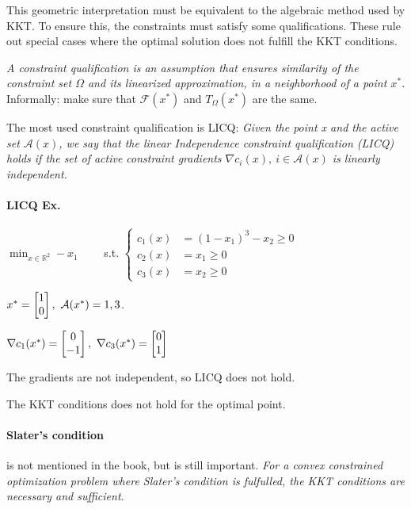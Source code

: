 \documentclass{article}
\begin{document}
This geometric interpretation must be equivalent to the algebraic method used by KKT. To ensure this, the constraints must satisfy some qualifications.
These rule out special cases where the optimal solution does not fulfill the KKT conditions.


\medskip \textit{A constraint qualification is an assumption that ensures similarity of the constraint set $\Omega$ and
  its linearized approximation, in a neighborhood of a point $x^*$.} Informally: make sure that $\mathcal{F}(x^*)$ and $T_{\Omega}(x^*)$ are the same.

\medskip The most used constraint qualification is LICQ: \textit{Given the point x and the active set $\mathcal{A}(x)$, we say that the linear Independence constraint qualification (LICQ) holds if the set
  of active constraint gradients $\nabla c_i(x),\ i\in \mathcal{A}(x)$ is linearly independent.}

\paragraph{LICQ Ex.} $\min_{x \in\mathbb{R}^{2}} -x_1 \qquad$ s.t.
$
  \left\{
  \begin{aligned}
    c_1(x) & = (1-x_1)^3 - x_2 \geq 0 \\
    c_2(x) & = x_1 \geq 0             \\
    c_3(x) & = x_2 \geq 0
  \end{aligned}
  \right.
$

\begin{minipage}[c]{0.5\textwidth}
\end{minipage}
\begin{minipage}[c]{0.5\textwidth}
  $x^* =\begin{bmatrix} 1 \\ 0 \end{bmatrix},\ \mathcal{A}(x^*) = {1, 3}$.
  
  \medskip $\nabla c_1(x^*) = \begin{bmatrix} 0 \\ -1 \end{bmatrix} ,\ \nabla c_3(x^*) = \begin{bmatrix} 0 \\ 1 \end{bmatrix}$

  \medskip The gradients are not independent, so LICQ does not hold.
\end{minipage}

The KKT conditions does not hold for the optimal point. 

\paragraph{Slater's condition} is not mentioned in the book, but is still important. \textit{For a convex constrained optimization problem where Slater's condition is 
fulfulled, the KKT conditions are necessary and sufficient}. 
\end{document}
